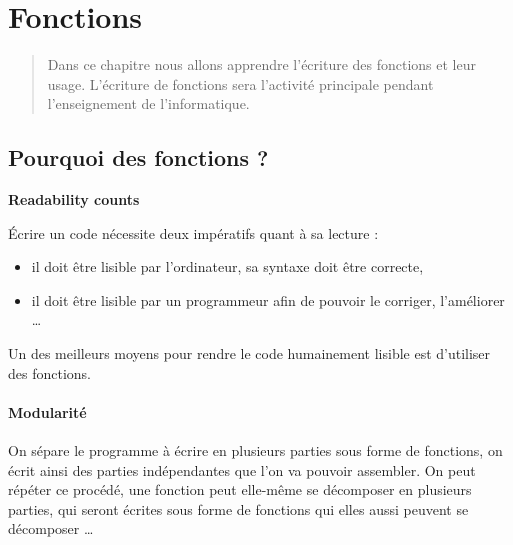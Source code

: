 \chapter{Fonctions}
\thispagestyle{empty}
\begin{abstract}Dans ce chapitre nous allons apprendre l'écriture des fonctions et leur usage.
L'écriture de fonctions sera l'activité principale pendant l'enseignement de l'informatique.

\end{abstract}
\section{Pourquoi des fonctions ?}

{\bf Readability counts}

Écrire un code nécessite deux impératifs quant à sa lecture :
\begin{itemize}
\item il doit être lisible par l'ordinateur, sa syntaxe doit être correcte,
\item il doit être lisible par un programmeur afin de pouvoir le corriger, l'améliorer \dots
\end{itemize}

Un des meilleurs moyens pour rendre le code humainement lisible est d'utiliser des fonctions.

\subsubsection{Modularité}
On sépare le programme à écrire en plusieurs parties sous forme de fonctions, on écrit ainsi des parties indépendantes que l'on va pouvoir assembler. On peut répéter ce procédé, une fonction peut elle-même se décomposer en plusieurs parties, qui seront écrites sous forme de fonctions qui elles aussi peuvent se décomposer \dots


